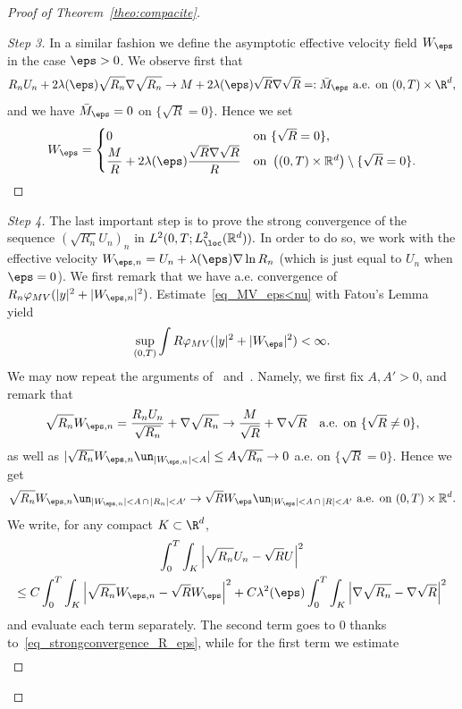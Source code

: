 \begin{proof}[Proof of Theorem~\ref{theo:compacite}]
\begin{proof}[Step 3]
In a similar fashion we define the asymptotic effective velocity field $W_\eps$ in the case $\eps >0$. We observe first that
\[
R_n U_n + 2\lambda(\eps) \sqrt{R_n} \nabla \sqrt{R_n}
\to M + 2\lambda(\eps) \sqrt{R} \nabla \sqrt{R} =: \bar M_\eps
\text{ a.e. on } (0,T)\times \R^d,
\]
and we have $ \bar M_\eps = 0$ on $\{\sqrt{R}=0\}.$ Hence we set
\[
W_\eps =
\begin{cases}
0 & \text{on }\{\sqrt{R} = 0\},\\
\dfrac{M}{R} +2\lambda(\eps) \dfrac{ \sqrt{R} \nabla \sqrt{R} }{R}&
\text{on }\left((0,T) \times \mathbb R^d \right)\setminus \{\sqrt{R} = 0\}.
\end{cases}
\]
\let\qed\relax
\end{proof}

\begin{proof}[Step 4]
The last important step is to prove the strong convergence of the sequence $(\sqrt{R_n} U_n)_{n}$ in $L^2(0,T;L^2_{\loc}(\mathbb R^d)).$ In order to do so, we work with the effective velocity $ W_{\eps,n} = U_n + \lambda(\eps) \nabla \ln R_n$ (which is just equal to $U_n$ when $\eps = 0$). We first remark that we have a.e. convergence of ${R_n}\varphi_{MV}(|y|^2 + |W_{\eps,n}|^2)$. Estimate~\eqref{eq_MV_eps<nu} with Fatou's Lemma yield
\[
\sup_{(0,T)} \int R \varphi_{MV}(|y|^2 + |W_\eps|^2) < \infty.
\]
We may now repeat the arguments of~\cite[p.~445--446]{MelletVasseur} and~\cite{AS-comp}. Namely, we first fix $A,A' >0$, and remark that
\[
\sqrt{R_n} W_{\eps,n} = \frac{R_n U_n}{\sqrt{R_n}} + \nabla \sqrt{R_n}
\to \frac{M}{\sqrt{R}} + \nabla \sqrt{R} \quad
\text{a.e. on } \{ \sqrt R \neq 0 \},
\]
as well as $|\sqrt{R_n} W_{\eps,n} \un_{|W_{\eps,n}| < A } |
\le A \sqrt{R_n} \to 0 $ a.e. on $\{ \sqrt R = 0 \}$. Hence we get
\[
\sqrt{R_n} W_{\eps,n} \un_{|W_{\eps,n}| < A \, \cap \, |R_n| < A'} \rightarrow
\sqrt{R} W_{\eps} \un_{|W_{\eps}| < A \, \cap \, |R| < A'}
\text{ a.e. on $(0,T) \times\mathbb R^d$}.
\]
We write, for any compact $K \subset \R^d$,
\begin{multline*}
\int_{0}^T \int_K \left|\sqrt{R_n} U_n - \sqrt{R} U \right|^2 \\
\le C\int_{0}^T \int_K \left|\sqrt{R_n} W_{\eps,n} - \sqrt{R} W_{\eps} \right|^2 + C \lambda^2(\eps)\int_{0}^T \int_K \left|\nabla \sqrt{R_n} - \nabla \sqrt{R} \right|^2
\end{multline*}
and evaluate each term separately. The second term goes to $0$ thanks to~\eqref{eq_strongconvergence_R_eps}, while for the first term we estimate
\begin{multline}\label{eq:conv-RW}

\end{multline}
\end{proof}
\end{proof}
